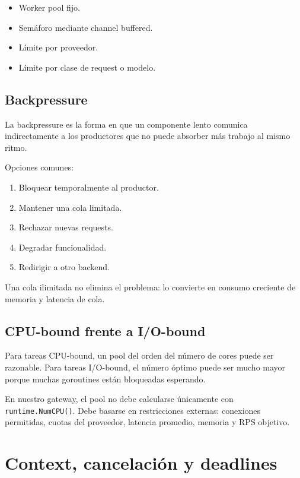 \documentclass[11pt,a4paper]{article}
\newcommand{\code}[1]{\texttt{#1}}
\begin{document}
\begin{itemize}
  \item Worker pool fijo.
  \item Semáforo mediante channel buffered.
  \item Límite por proveedor.
  \item Límite por clase de request o modelo.
\end{itemize}

\subsection{Backpressure}

La backpressure es la forma en que un componente lento comunica indirectamente a los productores que no puede absorber más trabajo al mismo ritmo.

Opciones comunes:

\begin{enumerate}
  \item Bloquear temporalmente al productor.
  \item Mantener una cola limitada.
  \item Rechazar nuevas requests.
  \item Degradar funcionalidad.
  \item Redirigir a otro backend.
\end{enumerate}

Una cola ilimitada no elimina el problema: lo convierte en consumo creciente de memoria y latencia de cola.

\subsection{CPU-bound frente a I/O-bound}

Para tareas CPU-bound, un pool del orden del número de cores puede ser razonable. Para tareas I/O-bound, el número óptimo puede ser mucho mayor porque muchas goroutines están bloqueadas esperando.

En nuestro gateway, el pool no debe calcularse únicamente con \code{runtime.NumCPU()}. Debe basarse en restricciones externas: conexiones permitidas, cuotas del proveedor, latencia promedio, memoria y RPS objetivo.

\section{Context, cancelación y deadlines}
\end{document}
